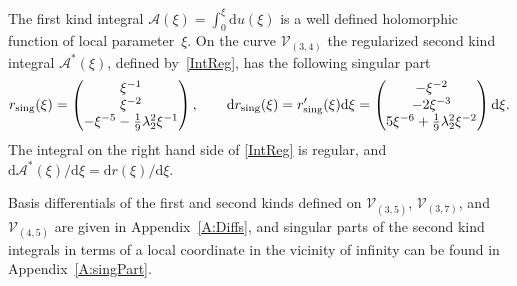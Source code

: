 \documentclass[pdftex]{sigma}
\numberwithin{equation}{section}
\newcommand{\rmd}{\mathrm{d}}
\begin{document}
The first kind integral $\mathcal{A}(\xi)=\int_0^{\xi} \rmd u(\xi)$ is a well defined holomorphic function {of local parameter~$\xi$}. On the curve $\mathcal{V}_{(3,4)}$ the regularized second kind integral $\mathcal{A}^\ast(\xi)$, defined by~\eqref{IntReg}, has the following singular part
\begin{gather*}%
 r_{\textup{sing}} (\xi) =\begin{pmatrix} \xi^{-1} \\ \xi^{-2}\\ - \xi^{-5} - \frac{1}{9}\lambda_2^2 \xi^{-1}\end{pmatrix} ,\qquad
 \rmd r_{\textup{sing}} (\xi) = r'_{\textup{sing}} (\xi) \rmd \xi = \begin{pmatrix} - \xi^{-2} \\ - 2 \xi^{-3}\\
 5 \xi^{-6} + \frac{1}{9} \lambda_2^2 \xi^{-2}\end{pmatrix} \rmd \xi.
\end{gather*}
The integral on the right hand side of \eqref{IntReg} is regular, and $\rmd \mathcal{A}^\ast(\xi)/\rmd \xi = \rmd r(\xi)/\rmd \xi$.

Basis differentials of the first and second kinds defined on $\mathcal{V}_{(3,5)}$, $\mathcal{V}_{(3,7)}$, and $\mathcal{V}_{(4,5)}$ are given in Appendix~\ref{A:Diffs}, and singular parts of the second kind integrals in terms of a local coordinate in the vicinity of infinity can be found in Appendix~\ref{A:singPart}.
\end{document}
